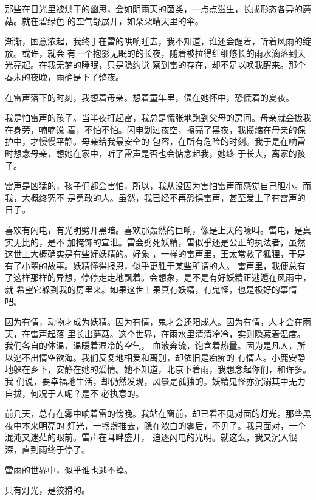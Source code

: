 \documentclass[12pt,a4paper]{article}
\begin{document}
		那些在日光里被烘干的幽思，会如阴雨天的菌类，一点点滋生，长成形态各异的蘑菇。就在碧绿色
	的空气舒展开，如朵朵晴天里的伞。

		渐渐，困意浓起，我终于在雷的哄响睡去，我不知道，谁还会醒着，听着风雨的绽放。或许，就会
	有一个抱影无眠的的长夜，随着被拉得纤细悠长的雨水滴落到天光亮起。在我无梦的睡眠，只是隐约觉
	察到雷的存在，却不足以唤我醒来。那个春末的夜晚，雨确是下了整夜。


		在雷声落下的时刻，我想着母亲。想着童年里，偎在她怀中，恐慌着的夏夜。


		我是怕雷声的孩子。当半夜打起雷，我总是慌张地跑到父母的房间。母亲就会拢我在身旁，喃喃说
	着，不怕不怕。闪电划过夜空，擦亮了黑夜，我攒缩在母亲的保护中，才慢慢平静。母亲给我最安全的
	包容，在所有危险的时刻。我于是在响雷时想念母亲，想她在家中，听了雷声是否也会惦念起我，她终
	于长大，离家的孩子。


		雷声是凶猛的，孩子们都会害怕，所以，我从没因为害怕雷声而感觉自己胆小。而我，大概终究不
	是勇敢的人。虽然，我已经不再恐惧雷声，甚至爱上了有雷声的日子。


		喜欢有闪电，有光明劈开黑暗。喜欢那轰然的巨响，像是上天的嚎叫。雷电，是真实无比的，是不
	加掩饰的宣泄。雷会劈死妖精，雷似乎还是公正的执法者，虽然这世上大概确实是有些好妖精的。好象
	，一样的雷声里，王太常救了狐狸，于是有了小翠的故事。妖精懂得报恩，似乎更胜于某些所谓的人。
	雷声里，我便总有了这样那样的异想，停停走走地飘着。会想象，是不是有好妖精正逃遁在风雨中，就
	希望它躲到我的房里来。如果这世上果真有妖精，有鬼怪，也是极好的事情吧。


		因为有情，动物才成为妖精。因为有情，鬼才会还阳成人。因为有情，人才会在雨天，在雷声起落
	里长出蘑菇。这个世界，在雨水里清清冷冷，实则隐藏着温度。我们各自的体温，温暖着湿冷的空气，
	血液奔流，饱含着热量。因为是凡人，所以逃不出情空欲海。我们反复地相爱和离别，却依旧是痴痴的
	有情人。小鹿安静地躲在乡下，安静在她的爱情。她不知道，北京下着雨，我想念起你们，和许多。我
	们说，要幸福地生活，却仍然发现，风景是孤独的。妖精鬼怪亦沉溺其中无力自拔，何况于人呢？是不
	必执意的。


		前几天，总有在雾中响着雷的傍晚。我站在窗前，却已看不见对面的灯光。那些黑夜中本来明亮的
	灯光，一盏盏推去，隐在浓白的雾后，不见了。我只面对，一个混沌又迷茫的眼前。雷声在耳畔盛开，
	追逐闪电的光明。就这么，我又沉入很深，直到雨终于停了。

		雷雨的世界中，似乎谁也逃不掉。

		只有灯光，是狡猾的。

	\endwriting


\end{document}
